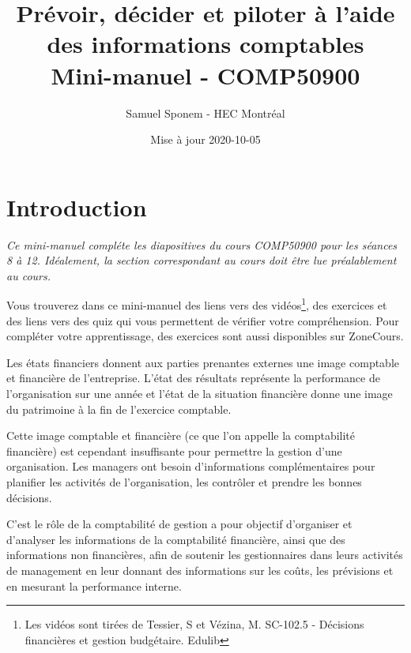 \documentclass[oneside]{kaobook}
\author{Samuel Sponem - HEC Montréal}
\date{Mise à jour 2020-10-05}
\title{Prévoir, décider et piloter à l'aide des informations comptables\\\medskip
\large Mini-manuel - COMP50900}
\begin{document}
\maketitle
\setcounter{tocdepth}{1}
\tableofcontents

\mainmatter
{}
\setchapterpreamble[u]{\margintoc}
\chapter{Introduction}
\label{sec:org7a6bc72}

\begin{kaobox}
\emph{Ce mini-manuel compléte les diapositives du cours COMP50900 pour les séances 8 à 12. Idéalement, la section correspondant au cours doit être lue préalablement au cours.}

Vous trouverez dans ce mini-manuel des liens vers des vidéos\footnote{Les vidéos sont tirées de Tessier, S et Vézina, M. SC-102.5 - Décisions financières et gestion budgétaire. Edulib}, des exercices et des liens vers des quiz qui vous permettent de vérifier votre compréhension. Pour compléter votre apprentissage, des exercices sont aussi disponibles sur ZoneCours.
\end{kaobox}

Les états financiers donnent aux parties prenantes externes une image comptable et financière de l'entreprise. L'état des résultats représente la performance de l'organisation sur une année et l'état de la situation financière donne une image du patrimoine à la fin de l'exercice comptable.

Cette image comptable et financière (ce que l'on appelle la comptabilité financière) est cependant insuffisante pour permettre la gestion d'une organisation. Les managers ont besoin d'informations complémentaires pour planifier les activités de l'organisation, les contrôler et prendre les bonnes décisions.

C'est le rôle de la comptabilité de gestion a pour objectif d'organiser et d'analyser les informations de la comptabilité financière, ainsi que des informations non financières, afin de soutenir les gestionnaires dans leurs activités de management en leur donnant des informations sur les coûts, les prévisions et en mesurant la performance interne.
\end{document}

